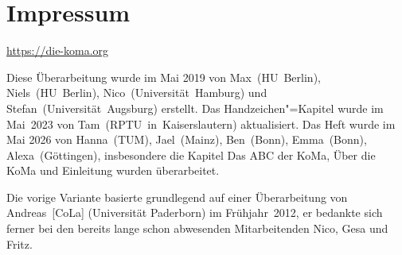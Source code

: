 \chapter{Impressum}

\begin{center}
    \url{https://die-koma.org}
\end{center}

\vspace{2em}

\noindent Diese Überarbeitung wurde im Mai 2019 von \mbox{Max (HU Berlin)}, \mbox{Niels (HU Berlin)}, \mbox{Nico (Universität Hamburg)} und \mbox{Stefan (Universität Augsburg)} erstellt.
Das  Handzeichen"=Kapitel wurde im Mai~2023 von \mbox{Tam (RPTU in Kaiserslautern)} aktualisiert.
Das Heft wurde im Mai 2026 von \mbox{Hanna (TUM)}, \mbox{Jael (Mainz)}, \mbox{Ben (Bonn)}, \mbox{Emma (Bonn)}, \mbox{Alexa (Göttingen)}, insbesondere die Kapitel Das ABC der KoMa, Über die KoMa und Einleitung wurden überarbeitet.
\vspace{1em}

\noindent Die vorige Variante basierte grundlegend auf einer Überarbeitung von \mbox{Andreas [CoLa]} (Universität Paderborn) im Frühjahr~2012, er bedankte sich ferner bei den bereits lange schon abwesenden Mitarbeitenden Nico, Gesa und Fritz.
